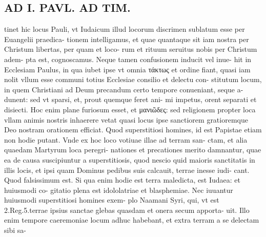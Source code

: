 \documentclass{article}
\begin{document}
\begin{pages}
\section*{AD I. PAVL. AD TIM. }
\marginpar{[ p.68 ]}\pstart tinet hic locus Pauli, vt Iudaicum illud locorum discrimen sublatum esse per Euangelii praedica- tionem intelligamus, et quae quantaque sit iam nostra per Christum libertas, per quam et loco- rum et rituum seruitus nobis per Christum adem- pta est, cognoscamus.  \pend\pstart Neque tamen confusionem inducit vel inue- hit in Ecclesiam Paulus, in qua iubet ipse vt omnia τάκτως et ordine fiant, quasi iam nolit vllum esse communi totius Ecclesiae consilio et delectu con- stitutum locum, in quem Christiani ad Deum precandum certo tempore conueniant, seque a- dunent: sed vt sparsi, et, prout quemque feret ani- mi impetus, orent separati et disiecti. Hoc enim plane furiosum esset, et μανιῶδες: sed religionem propter loca vllam animis nostris inhaerere vetat quasi locus ipse sanctiorem gratioremque Deo nostram orationem efficiat. Quod superstitiosi homines, id est Papistae etiam non hodie putant.  \pend\pstart Vnde ex hoc loco votiuae illae ad terram san- ctam, et alia quaedam Martyrum loca peregri- nationes et precationes merito damnantur, quae ea de causa suscipiuntur a superstitiosis, quod nescio quid maioris sanctitatis in illis locis, et ipsi quam Dominus pedibus suis calcauit, terrae inesse iudi- cant. Quod falsissimum est. Si qua enim hodie est terra maledicta, est Iudaea: et huiusmodi co- gitatio plena est idololatriae et blasphemiae. Nec iuuantur huiusmodi superstitiosi homines exem- plo Naamani Syri, qui, vt est 2.Reg.5.terrae ipsius sanctae glebas quasdam et onera secum apporta- uit. Illo enim tempore caeremoniae locum adhuc habebant, et extra terram a se delectam sibi sa-  \pend

\end{pages}
\end{document}
